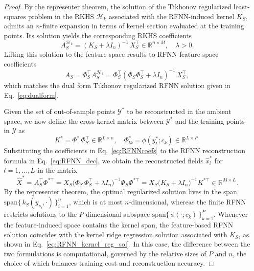\documentclass{article}
\begin{document}
\begin{proof}
By the representer theorem, %
the solution of the Tikhonov regularized least-squares problem in the RKHS $\mathcal{H}_k$ associated with the RFNN-induced kernel $K_S$, admits an $n$-finite expansion in terms of kernel section evaluated at the training points. Its solution yields the corresponding RKHS coefficients \cite{bollt2020regularized}
\begin{equation}
    A^{\mathcal{H}_k}_S=(K_S+\lambda I_n)^{-1}\,X^{\top}_S \in \mathbb{R}^{n\times M}, \quad \lambda>0.
    \label{eq:ridge3}
\end{equation}
Lifting this solution to the feature space results to RFNN feature-space coefficients
\begin{equation}
    A_S = \Phi_S^\top A^{\mathcal{H}_k}_S= \Phi^\top_S (\Phi_S \Phi^\top_S + \lambda I_n)^{-1}\, X^{\top}_S,
    \label{eq:RFNNcoefs}
\end{equation}
which matches the dual form Tikhonov regularized RFNN solution given in Eq.~\eqref{eq:dualform}. 
 
Given the set of out-of-sample points $\mathcal{Y}^*$ to be reconstructed in the ambient space, we now define the cross-kernel matrix between $\mathcal{Y}^*$ and the training points in $\mathcal{Y}$ as
\begin{equation}
    K^*= \Phi^*\, \Phi_S^\top \in \mathbb{R}^{L \times n}, \quad 
    \Phi^*_{lk}=\phi(y^*_l;c_k) \in \mathbb{R}^{L \times P}.
\end{equation}
Substituting the coefficients in Eq.~\eqref{eq:RFNNcoefs} to the  RFNN reconstruction formula in Eq.~\eqref{eq:RFNN_dec}, we obtain the reconstructed fields $\hat{x}^*_l$ for $l=1,\ldots,L$ in the matrix
\begin{equation}
    \widehat{X}^* = A^{\top}_S \Phi^{*\top} = X_S \big(\Phi_S\, \Phi_S^\top + \lambda I_n \big)^{-1} \Phi_S \Phi^{*\top} = X_S \big(K_S + \lambda I_n \big)^{-1} K^{*\top} \in \mathbb{R}^{M \times L}.
    \label{eq:RFNN_kernel_reg_sol}
\end{equation}
By the representer theorem, the optimal regularized solution lives in the span $\mathrm{span}\{\,k_S(y_{s_i},\cdot)\,\}_{i=1}^n$, which is at most $n$-dimensional, whereas the finite RFNN restricts solutions to the $P$-dimensional subspace $\mathrm{span}\{\, \phi(\cdot; c_k) \,\}_{k=1}^P$. Whenever the feature-induced space contains the kernel  span, the feature-based RFNN solution coincides with the kernel ridge regression solution associated with $K_S$, as shown in Eq.~\eqref{eq:RFNN_kernel_reg_sol}. In this case, the difference between the two formulations is computational, governed by the relative sizes of $P$ and $n$, the choice of which balances training cost and reconstruction accuracy.


\end{proof}
\end{document}
